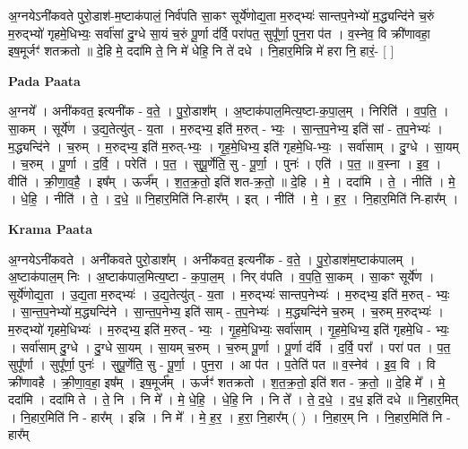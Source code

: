 \documentclass[17pt]{extarticle}
\begin{document}
अ॒ग्नयेऽनी॑कवते पुरो॒डाश॑-म॒ष्टाक॑पालं॒ निर्व॑पति सा॒कꣳ सूर्ये॑णोद्य॒ता म॒रुद्भ्यः॑ सान्तप॒नेभ्यो॑ म॒द्ध्यन्दि॑ने च॒रुं म॒रुद्भ्यो॑ गृहमे॒धिभ्यः॒ सर्वा॑सां दु॒ग्धे सा॒यं च॒रुं पू॒र्णा द॑र्वि॒ परा॑पत॒ सुपू᳚र्णा॒ पुन॒रा प॑त । व॒स्नेव॒ वि क्री॑णावहा॒ इष॒मूर्जꣳ॑ शतक्रतो ॥ दे॒हि मे॒ ददा॑मि ते॒ नि मे॑ धेहि॒ नि ते॑ दधे । नि॒हार॒मिन्नि मे॑ हरा नि॒ हारं॒- [ ] \newline

\textbf{Pada Paata} \newline

अ॒ग्नये᳚ । अनी॑कवत॒ इत्यनी॑क - व॒ते॒ । पु॒रो॒डाश᳚म् । अ॒ष्टाक॑पाल॒मित्य॒ष्टा-क॒पा॒ल॒म् । निरिति॑ । व॒प॒ति॒ । सा॒कम् । सूर्ये॑ण । उ॒द्य॒तेत्यु॑त् - य॒ता । म॒रुद्भ्य॒ इति॑ म॒रुत् - भ्यः॒ । सा॒न्त॒प॒नेभ्य॒ इति॑ सां - त॒प॒नेभ्यः॑ । म॒द्ध्यन्दि॑ने । च॒रुम् । म॒रुद्भ्य॒ इति॑ म॒रुत्-भ्यः॒ । गृ॒ह॒मे॒धिभ्य॒ इति॑ गृहमे॒धि-भ्यः॒ । सर्वा॑साम् । दु॒ग्धे । सा॒यम् । च॒रुम् । पू॒र्णा । द॒र्वि॒ । परेति॑ । प॒त॒ । सुपू॒र्णेति॒ सु - पू॒र्णा॒ । पुनः॑ । एति॑ । प॒त॒ ॥ व॒स्ना । इ॒व॒ । वीति॑ । क्री॒णा॒व॒है॒ । इष᳚म् । ऊर्ज᳚म् । श॒त॒क्र॒तो॒ इति॑ शत-क्र॒तो॒ ॥ दे॒हि । मे॒ । ददा॑मि । ते॒ । नीति॑ । मे॒ । धे॒हि॒ । नीति॑ । ते॒ । द॒धे॒ ॥ नि॒हार॒मिति॑ नि-हार᳚म् । इत् । नीति॑ । मे॒ । ह॒र॒ । नि॒हार॒मिति॑ नि-हार᳚म् ।  \newline


\textbf{Krama Paata} \newline

अ॒ग्नयेऽनी॑कवते । अनी॑कवते पुरो॒डाश᳚म् । अनी॑कवत॒ इत्यनी॑क - व॒ते॒ । पु॒रो॒डाश॑म॒ष्टाक॑पालम् । अ॒ष्टाक॑पाल॒म् निः । अ॒ष्टाक॑पाल॒मित्य॒ष्टा - क॒पा॒ल॒म् । निर् व॑पति । व॒प॒ति॒ सा॒कम् । सा॒कꣳ सूर्ये॑ण । सूर्ये॑णोद्य॒ता । उ॒द्य॒ता म॒रुद्भ्यः॑ । उ॒द्य॒तेत्यु॑त् - य॒ता । म॒रुद्भ्यः॑ सान्तप॒नेभ्यः॑ । म॒रुद्भ्य॒ इति॑ म॒रुत् - भ्यः॒ । सा॒न्त॒प॒नेभ्यो॑ म॒द्ध्यन्दि॑ने । सा॒न्त॒प॒नेभ्य॒ इति॑ साम् - त॒प॒नेभ्यः॑ । म॒द्ध्यन्दि॑ने च॒रुम् । च॒रुम् म॒रुद्भ्यः॑ । म॒रुद्भ्यो॑ गृहमे॒धिभ्यः॑ । म॒रुद्भ्य॒ इति॑ म॒रुत् - भ्यः॒ । गृ॒ह॒मे॒धिभ्यः॒ सर्वा॑साम् । गृ॒ह॒मे॒धिभ्य॒ इति॑ गृहमे॒धि - भ्यः॒ । सर्वा॑साम् दु॒ग्धे । दु॒ग्धे सा॒यम् । सा॒यम् च॒रुम् । च॒रुम् पू॒र्णा । पू॒र्णा द॑र्वि । द॒र्वि॒ परा᳚ । परा॑ पत । प॒त॒ सुपू᳚र्णा । सुपू᳚र्णा॒ पुनः॑ । सुपू॒र्णेति॒ सु - पू॒र्णा॒ । पुन॒रा । आ प॑त । प॒तेति॑ पत ॥ व॒स्नेव॑ । इ॒व॒ वि । वि क्री॑णावहै । क्री॒णा॒व॒हा॒ इष᳚म् । इष॒मूर्ज᳚म् । ऊर्जꣳ॑ शतक्रतो । श॒त॒क्र॒तो॒ इति॑ शत - क्र॒तो॒ ॥ दे॒हि मे᳚ । मे॒ ददा॑मि । ददा॑मि ते । ते॒ नि । नि मे᳚ । मे॒ धे॒हि॒ । धे॒हि॒ नि । नि ते᳚ । ते॒ द॒धे॒ । द॒ध॒ इति॑ दधे ॥ नि॒हार॒मित् । नि॒हार॒मिति॑ नि - हार᳚म् । इन्नि । नि मे᳚ । मे॒ ह॒र॒ । ह॒रा॒ नि॒हार᳚म् ( ) । नि॒हार॒म् नि । नि॒हार॒मिति॑ नि - हार᳚म् \newline
\end{document}
